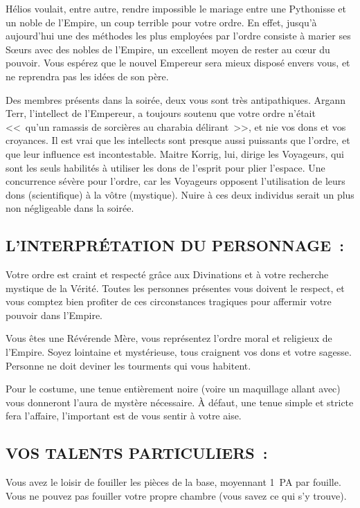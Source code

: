 \documentclass[14pt,twocolumn]{extarticle}
\begin{document}
Hélios voulait, entre autre, rendre impossible le mariage entre une Pythonisse
et un noble de l'Empire, un coup terrible pour votre ordre. En effet, jusqu'à
aujourd'hui une des méthodes les plus employées par l'ordre consiste à marier
ses S\oe{}urs avec des nobles de l'Empire, un excellent moyen de rester au
c\oe{}ur du pouvoir. Vous espérez que le nouvel Empereur sera mieux disposé
envers vous, et ne reprendra pas les idées de son père.

Des membres présents dans la soirée, deux vous sont très antipathiques. Argann
Terr, l'intellect de l'Empereur, a toujours soutenu que votre ordre n'était
<<~qu'un ramassis de sorcières au charabia délirant~>>, et nie vos dons et vos
croyances. Il est vrai que les intellects sont presque aussi puissants que
l'ordre, et que leur influence est incontestable. Maitre Korrig, lui, dirige
les Voyageurs, qui sont les seuls habilités à utiliser les dons de l'esprit
pour plier l'espace. Une concurrence sévère pour l'ordre, car les Voyageurs
opposent l'utilisation de leurs dons (scientifique) à la vôtre (mystique).
Nuire à ces deux individus serait un plus non négligeable dans la soirée.

\subsection{L'INTERPRÉTATION DU PERSONNAGE~:}

Votre ordre est craint et respecté grâce aux Divinations et à votre recherche
mystique de la Vérité. Toutes les personnes présentes vous doivent le respect,
et vous comptez bien profiter de ces circonstances tragiques pour affermir
votre pouvoir dans l'Empire.

Vous êtes une Révérende Mère, vous représentez l'ordre moral et religieux
de l'Empire. Soyez lointaine et mystérieuse, tous craignent vos dons et votre
sagesse. Personne ne doit deviner les tourments qui vous habitent.

Pour le costume, une tenue entièrement noire (voire un maquillage allant avec)
vous donneront l'aura de mystère nécessaire. À défaut, une tenue simple et
stricte fera l'affaire, l'important est de vous sentir à votre aise.

\subsection{VOS TALENTS PARTICULIERS~:}

Vous avez le loisir de fouiller les pièces de la base, moyennant 1~PA par
fouille. Vous ne pouvez pas fouiller votre propre chambre (vous savez ce qui
s'y trouve).
\end{document}
